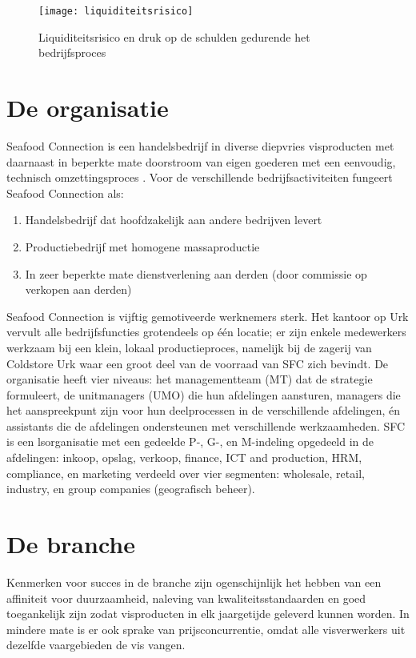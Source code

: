 \begin{figure}[!h]
    \centering
    \texttt{[image: liquiditeitsrisico]}
    \caption{Liquiditeitsrisico en druk op de schulden gedurende het bedrijfsproces}
    \label{fig:liquiditeitsrisico}
\end{figure}


\section{De organisatie}
Seafood Connection is een handelsbedrijf in diverse diepvries visproducten met daarnaast in beperkte mate doorstroom van eigen goederen met een eenvoudig, technisch omzettingsproces \citep{aoibsfc}. Voor de verschillende bedrijfsactiviteiten fungeert Seafood Connection als:

\begin{enumerate}
    \item Handelsbedrijf dat hoofdzakelijk aan andere bedrijven levert
    \item Productiebedrijf met homogene massaproductie
    \item In zeer beperkte mate dienstverlening aan derden (door commissie op verkopen aan derden)
\end{enumerate}

Seafood Connection is vijftig gemotiveerde werknemers sterk. Het kantoor op Urk vervult alle bedrijfsfuncties grotendeels op één locatie; er zijn enkele medewerkers werkzaam bij een klein, lokaal productieproces, namelijk bij de zagerij van Coldstore Urk waar een groot deel van de voorraad van SFC zich bevindt. De organisatie heeft vier niveaus: het managementteam (MT) dat de strategie formuleert, de unitmanagers (UMO) die hun afdelingen aansturen, managers die het aanspreekpunt zijn voor hun deelprocessen in de verschillende afdelingen, én assistants die de afdelingen ondersteunen met verschillende werkzaamheden. SFC is een \gls{lsorganisatie} met een gedeelde P-, G-, en M-indeling opgedeeld in de afdelingen: inkoop, opslag, verkoop, finance, ICT and production, HRM, compliance, en marketing verdeeld over vier segmenten: wholesale, retail, industry, en group companies (geografisch beheer). \citep{quickscan,sfcreglement}

\section{De branche}
Kenmerken voor succes in de branche zijn ogenschijnlijk het hebben van een affiniteit voor duurzaamheid, naleving van kwaliteitsstandaarden en goed toegankelijk zijn zodat visproducten in elk jaargetijde geleverd kunnen worden. In mindere mate is er ook sprake van prijsconcurrentie, omdat alle visverwerkers uit dezelfde vaargebieden de vis vangen. 


